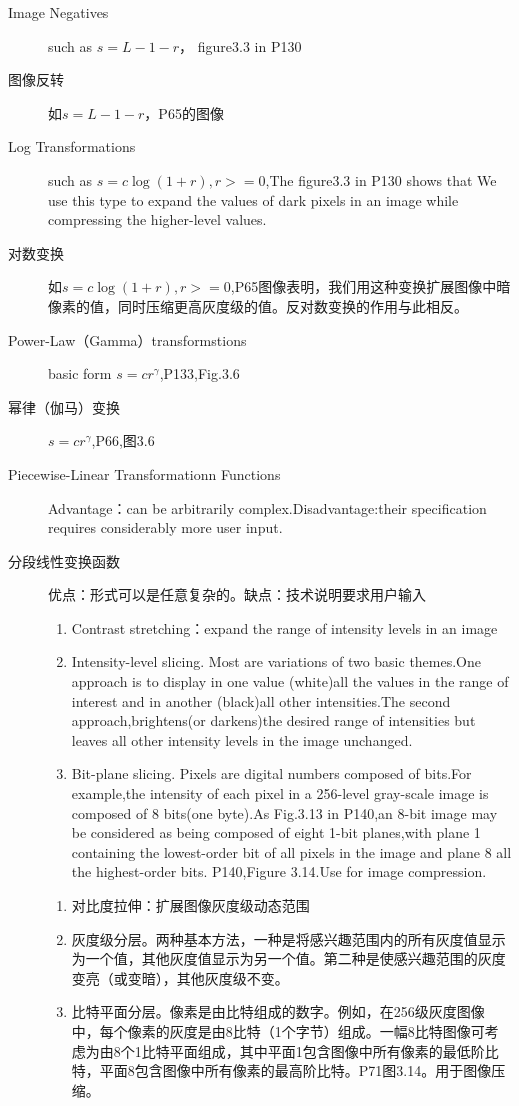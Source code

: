 \documentclass[a4paper,12pt]{article}
\numberwithin{equation}{section}%
\begin{document}
\begin{description}
\item[Image Negatives]such as $s=L-1-r$， figure3.3 in P130

\item[图像反转]如$s=L-1-r$，P65的图像

\item[Log Transformations]such as $s=c\log(1+r),r>=0$,The figure3.3 in P130 shows that We use this type to expand the values of dark pixels in an image  while compressing the higher-level values.

\item[对数变换]如$s=c\log(1+r),r>=0$,P65图像表明，我们用这种变换扩展图像中暗像素的值，同时压缩更高灰度级的值。反对数变换的作用与此相反。
\item[Power-Law（Gamma）transformstions]basic form $s=cr^\gamma$,P133,Fig.3.6

\item[幂律（伽马）变换]$s=cr^\gamma$,P66,图3.6

\item[Piecewise-Linear Transformationn Functions]Advantage：can be arbitrarily complex.\quad Disadvantage:their specification requires considerably more user input.

\item[分段线性变换函数]优点：形式可以是任意复杂的。\quad 缺点：技术说明要求用户输入

 \begin{enumerate}
 \item Contrast stretching：expand the range of intensity levels in an image
 \item Intensity-level slicing. Most are variations of two basic themes.One approach is to display in one value (white)all the values in the range of interest and in another (black)all other intensities.The second approach,brightens(or darkens)the desired range of intensities but leaves all other intensity levels in the image unchanged.  
\item Bit-plane slicing. Pixels are digital numbers composed of bits.For example,the intensity of each pixel in a 256-level gray-scale image is composed of 8 bits(one byte).As Fig.3.13 in P140,an 8-bit image may be considered as being composed of eight 1-bit planes,with plane 1 containing the lowest-order bit of all pixels in the image and plane 8 all the highest-order bits. P140,Figure 3.14.Use for image compression.

 \end{enumerate}
 \begin{enumerate}
 \item 对比度拉伸：扩展图像灰度级动态范围
 \item 灰度级分层。两种基本方法，一种是将感兴趣范围内的所有灰度值显示为一个值，其他灰度值显示为另一个值。第二种是使感兴趣范围的灰度变亮（或变暗），其他灰度级不变。
\item 比特平面分层。像素是由比特组成的数字。例如，在256级灰度图像中，每个像素的灰度是由8比特（1个字节）组成。一幅8比特图像可考虑为由8个1比特平面组成，其中平面1包含图像中所有像素的最低阶比特，平面8包含图像中所有像素的最高阶比特。P71图3.14。用于图像压缩。
 \end{enumerate}
\end{description}
\end{document}
